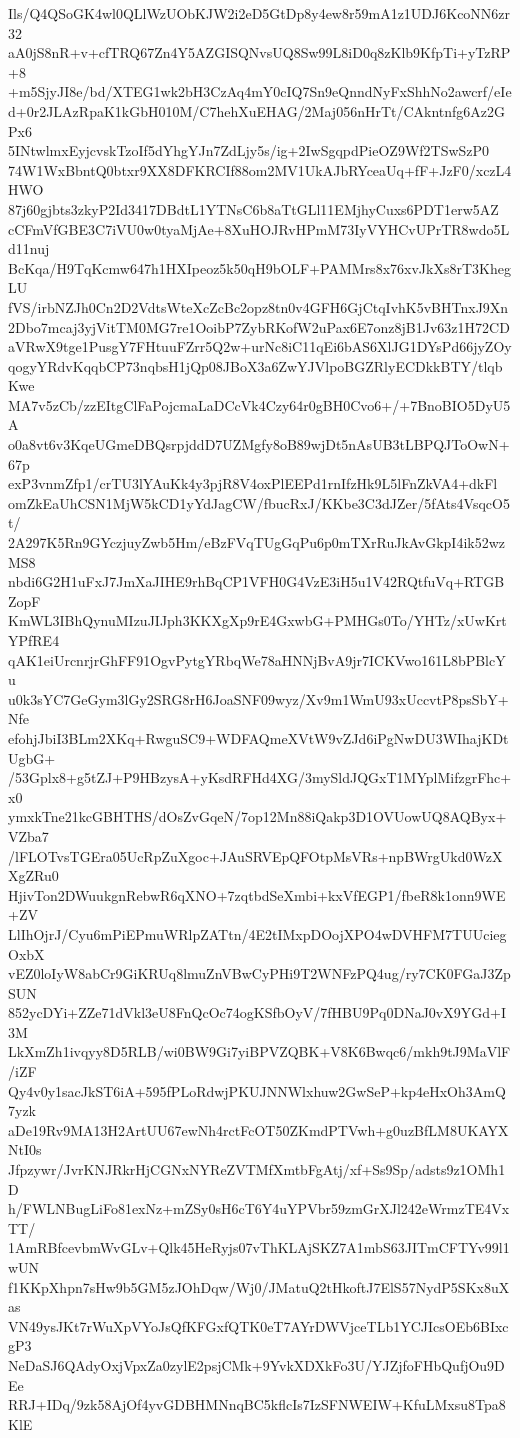 Ils/Q4QSoGK4wl0QLlWzUObKJW2i2eD5GtDp8y4ew8r59mA1z1UDJ6KcoNN6zr32
aA0jS8nR+v+cfTRQ67Zn4Y5AZGISQNvsUQ8Sw99L8iD0q8zKlb9KfpTi+yTzRP+8
+m5SjyJI8e/bd/XTEG1wk2bH3CzAq4mY0cIQ7Sn9eQnndNyFxShhNo2awcrf/eIe
d+0r2JLAzRpaK1kGbH010M/C7hehXuEHAG/2Maj056nHrTt/CAkntnfg6Az2GPx6
5INtwlmxEyjcvskTzoIf5dYhgYJn7ZdLjy5s/ig+2IwSgqpdPieOZ9Wf2TSwSzP0
74W1WxBbntQ0btxr9XX8DFKRCIf88om2MV1UkAJbRYceaUq+fF+JzF0/xczL4HWO
87j60gjbts3zkyP2Id3417DBdtL1YTNsC6b8aTtGLl11EMjhyCuxs6PDT1erw5AZ
cCFmVfGBE3C7iVU0w0tyaMjAe+8XuHOJRvHPmM73IyVYHCvUPrTR8wdo5Ld11nuj
BcKqa/H9TqKcmw647h1HXIpeoz5k50qH9bOLF+PAMMrs8x76xvJkXs8rT3KhegLU
fVS/irbNZJh0Cn2D2VdtsWteXcZcBc2opz8tn0v4GFH6GjCtqIvhK5vBHTnxJ9Xn
2Dbo7mcaj3yjVitTM0MG7re1OoibP7ZybRKofW2uPax6E7onz8jB1Jv63z1H72CD
aVRwX9tge1PusgY7FHtuuFZrr5Q2w+urNc8iC11qEi6bAS6XlJG1DYsPd66jyZOy
qogyYRdvKqqbCP73nqbsH1jQp08JBoX3a6ZwYJVlpoBGZRlyECDkkBTY/tlqbKwe
MA7v5zCb/zzEItgClFaPojcmaLaDCcVk4Czy64r0gBH0Cvo6+/+7BnoBIO5DyU5A
o0a8vt6v3KqeUGmeDBQsrpjddD7UZMgfy8oB89wjDt5nAsUB3tLBPQJToOwN+67p
exP3vnmZfp1/crTU3lYAuKk4y3pjR8V4oxPlEEPd1rnIfzHk9L5lFnZkVA4+dkFl
omZkEaUhCSN1MjW5kCD1yYdJagCW/fbucRxJ/KKbe3C3dJZer/5fAts4VsqcO5t/
2A297K5Rn9GYczjuyZwb5Hm/eBzFVqTUgGqPu6p0mTXrRuJkAvGkpI4ik52wzMS8
nbdi6G2H1uFxJ7JmXaJIHE9rhBqCP1VFH0G4VzE3iH5u1V42RQtfuVq+RTGBZopF
KmWL3IBhQynuMIzuJIJph3KKXgXp9rE4GxwbG+PMHGs0To/YHTz/xUwKrtYPfRE4
qAK1eiUrcnrjrGhFF91OgvPytgYRbqWe78aHNNjBvA9jr7ICKVwo161L8bPBlcYu
u0k3sYC7GeGym3lGy2SRG8rH6JoaSNF09wyz/Xv9m1WmU93xUccvtP8psSbY+Nfe
efohjJbiI3BLm2XKq+RwguSC9+WDFAQmeXVtW9vZJd6iPgNwDU3WIhajKDtUgbG+
/53Gplx8+g5tZJ+P9HBzysA+yKsdRFHd4XG/3mySldJQGxT1MYplMifzgrFhc+x0
ymxkTne21kcGBHTHS/dOsZvGqeN/7op12Mn88iQakp3D1OVUowUQ8AQByx+VZba7
/lFLOTvsTGEra05UcRpZuXgoc+JAuSRVEpQFOtpMsVRs+npBWrgUkd0WzXXgZRu0
HjivTon2DWuukgnRebwR6qXNO+7zqtbdSeXmbi+kxVfEGP1/fbeR8k1onn9WE+ZV
LlIhOjrJ/Cyu6mPiEPmuWRlpZATtn/4E2tIMxpDOojXPO4wDVHFM7TUUciegOxbX
vEZ0loIyW8abCr9GiKRUq8lmuZnVBwCyPHi9T2WNFzPQ4ug/ry7CK0FGaJ3ZpSUN
852ycDYi+ZZe71dVkl3eU8FnQcOc74ogKSfbOyV/7fHBU9Pq0DNaJ0vX9YGd+I3M
LkXmZh1ivqyy8D5RLB/wi0BW9Gi7yiBPVZQBK+V8K6Bwqc6/mkh9tJ9MaVlF/iZF
Qy4v0y1sacJkST6iA+595fPLoRdwjPKUJNNWlxhuw2GwSeP+kp4eHxOh3AmQ7yzk
aDe19Rv9MA13H2ArtUU67ewNh4rctFcOT50ZKmdPTVwh+g0uzBfLM8UKAYXNtI0s
Jfpzywr/JvrKNJRkrHjCGNxNYReZVTMfXmtbFgAtj/xf+Ss9Sp/adsts9z1OMh1D
h/FWLNBugLiFo81exNz+mZSy0sH6cT6Y4uYPVbr59zmGrXJl242eWrmzTE4VxTT/
1AmRBfcevbmWvGLv+Qlk45HeRyjs07vThKLAjSKZ7A1mbS63JITmCFTYv99l1wUN
f1KKpXhpn7sHw9b5GM5zJOhDqw/Wj0/JMatuQ2tHkoftJ7ElS57NydP5SKx8uXas
VN49ysJKt7rWuXpVYoJsQfKFGxfQTK0eT7AYrDWVjceTLb1YCJIcsOEb6BIxcgP3
NeDaSJ6QAdyOxjVpxZa0zylE2psjCMk+9YvkXDXkFo3U/YJZjfoFHbQufjOu9DEe
RRJ+IDq/9zk58AjOf4yvGDBHMNnqBC5kflcIs7IzSFNWEIW+KfuLMxsu8Tpa8KlE
